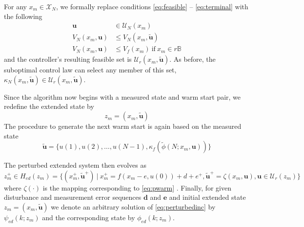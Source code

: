 \documentclass{article}
\begin{document}
For any $x_m \in \mathcal{X}_N$, we formally replace conditions \eqref{eq:feasible} -- 
\eqref{eq:terminal} with the following 
\begin{align}
\label{eq:pfeasible}
\mathbf{u} &\in \mathcal{U}_N(x_m) \\
\label{eq:pimproved}
V_N(x_m,\mathbf{u}) &\leq V_N(x_m,\tilde{\mathbf{u}}) \\
\label{eq:pterminal}
V_N(x_m,\mathbf{u}) &\leq V_f(x_m) \ \text{if} \ x_m \in r\mathbb{B}
\end{align}
and the controller's resulting feasible set is $\mathcal{U}_r(x_m,\tilde{\mathbf{u}})$. 
As before, the suboptimal control law can select any member of this set, $\kappa_N(x_m,\tilde{\mathbf{u}}) 
\in \mathcal{U}_r(x_m,\tilde{\mathbf{u}})$. 

Since the algorithm now begins with a measured state and warm start pair, we redefine the extended state by
\begin{equation*}
z_m = (x_m,\tilde{\mathbf{u}})
\end{equation*}
The procedure to generate the next warm start is again based on the measured state
\begin{equation}
\label{eq:pwarm}
\tilde{\mathbf{u}} = \{u(1),u(2),\dots,u(N-1),\kappa_f(\tilde{\phi}(N;x_m,\mathbf{u}))\}
\end{equation}

The perturbed extended system then evolves as
\begin{equation}
\label{eq:perturbedinc}
z_m^+ \in H_{ed}(z_m) = \{(x_m^+,\tilde{\mathbf{u}}^+) \ | \ x_m^+ = f(x_m-e,u(0))+d+e^+, 
\tilde{\mathbf{u}}^+ = \zeta(x_m,\mathbf{u}), \mathbf{u} \in \mathcal{U}_r(z_m)\}
\end{equation}
where $\zeta(\cdot)$ is the mapping corresponding to \eqref{eq:pwarm} 
.
Finally, for given disturbance and measurement error sequences $\mathbf{d}$ and $\mathbf{e}$
and initial extended state $z_m = (x_m,\tilde{\mathbf{u}})$ we denote an arbitrary solution of 
\eqref{eq:perturbedinc}
by $\psi_{ed}(k;z_m)$ and the corresponding state by $\phi_{ed}(k;z_m)$.
\end{document}
